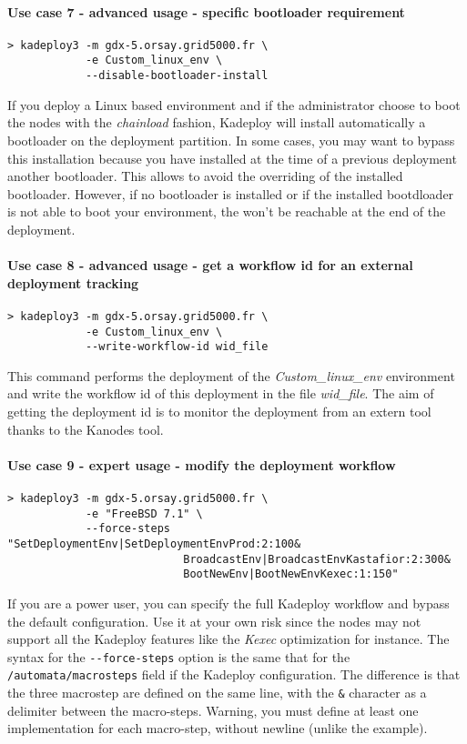 \documentclass[a4wide,10pt,oneside]{book}
\newcommand{\ypath}[1]{\texttt{#1}}
\begin{document}
\paragraph{Use case 7 - advanced usage - specific bootloader requirement}
\begin{verbatim}
> kadeploy3 -m gdx-5.orsay.grid5000.fr \
            -e Custom_linux_env \
            --disable-bootloader-install
\end{verbatim}
If you deploy a Linux based environment and if the administrator choose to boot the nodes with the \textit{chainload} fashion, Kadeploy will install automatically a bootloader on the deployment partition. In some cases, you may want to bypass this installation because you have installed at the time of a previous deployment another bootloader. This allows to avoid the overriding of the installed bootloader. However, if no bootloader is installed or if the installed bootdloader is not able to boot your environment, the won't be reachable at the end of the deployment.

\paragraph{Use case 8 - advanced usage - get a workflow id for an external deployment tracking}\label{par:usecase-wid}
\begin{verbatim}
> kadeploy3 -m gdx-5.orsay.grid5000.fr \
            -e Custom_linux_env \
            --write-workflow-id wid_file
\end{verbatim}
This command performs the deployment of the \textit{Custom\_linux\_env} environment and write the workflow id of this deployment in the file \textit{wid\_file}. The aim of getting the deployment id is to monitor the deployment from an extern tool thanks to the Kanodes tool.

\paragraph{Use case 9 - expert usage - modify the deployment workflow}
\begin{verbatim}
> kadeploy3 -m gdx-5.orsay.grid5000.fr \
            -e "FreeBSD 7.1" \
            --force-steps "SetDeploymentEnv|SetDeploymentEnvProd:2:100&
                           BroadcastEnv|BroadcastEnvKastafior:2:300&
                           BootNewEnv|BootNewEnvKexec:1:150"
\end{verbatim}
If you are a power user, you can specify the full Kadeploy workflow and bypass the default configuration. Use it at your own risk since the nodes may not support all the Kadeploy features like the \textit{Kexec} optimization for instance. The syntax for the \texttt{-{}-force-steps} option is the same that for the \ypath{/automata/macrosteps} field if the Kadeploy configuration. The difference is that the three macrostep are defined on the same line, with the \texttt{\&} character as a delimiter between the macro-steps. Warning, you must define at least one implementation for each macro-step, without newline (unlike the example).
\end{document}
